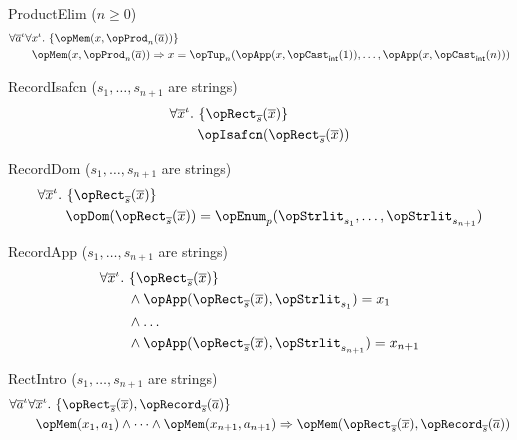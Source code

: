 \documentclass[11pt, a4paper, oneside]{article}
\begin{document}
\begin{axioms}
\item[ProductElim ($n \ge 0$)] \[
        \begin{aligned}
            &\forall \overline{a}^\idv \forall x^\idv.\, \st{ \opMem(x, \opProd_n(\overline{a})) } \\
            &\qquad \opMem(x, \opProd_n(\overline{a})) \imp x = \opTup_n(\opApp(x, \opCast_\int(1)), \dots, \opApp(x, \opCast_\int(n)))
        \end{aligned}
    \]

\item[RecordIsafcn (\rm$s_1,\dots,s_{n+1}$ are strings)] \[
        \begin{aligned}
            &\forall \overline{x}^\idv.\, \st{ \opRect_{\overline{s}}(\overline{x}) } \\
            &\qquad \opIsafcn(\opRect_{\overline{s}}(\overline{x}))
        \end{aligned}
    \]

\item[RecordDom (\rm$s_1,\dots,s_{n+1}$ are strings)] \[
        \begin{aligned}
            &\forall \overline{x}^\idv.\, \st{ \opRect_{\overline{s}}(\overline{x}) } \\
            &\qquad \opDom(\opRect_{\overline{s}}(\overline{x})) = \opEnum_p(\opStrlit_{s_1}, \dots, \opStrlit_{s_{n+1}})
        \end{aligned}
    \]

\item[RecordApp (\rm$s_1,\dots,s_{n+1}$ are strings)] \[
        \begin{aligned}
            &\forall \overline{x}^\idv.\, \st{ \opRect_{\overline{s}}(\overline{x}) } \\
            &\qquad \wedge \opApp(\opRect_{\overline{s}}(\overline{x}), \opStrlit_{s_1}) = x_1 \\
            &\qquad \wedge \dots \\
            &\qquad \wedge \opApp(\opRect_{\overline{s}}(\overline{x}), \opStrlit_{s_{n+1}}) = x_{n+1}
        \end{aligned}
    \]

\item[RectIntro (\rm$s_1,\dots,s_{n+1}$ are strings)] \[
        \begin{aligned}
            &\forall \overline{a}^\idv \forall \overline{x}^\idv.\, \st{ \opRect_{\overline{s}}(\overline{x}), \opRecord_{\overline{s}}(\overline{a}) } \\
            &\qquad \opMem(x_1, a_1) \wedge \dots \wedge \opMem(x_{n+1}, a_{n+1}) \imp \opMem(\opRect_{\overline{s}}(\overline{x}), \opRecord_{\overline{s}}(\overline{a}))
        \end{aligned}
    \]


\end{axioms}
\end{document}
